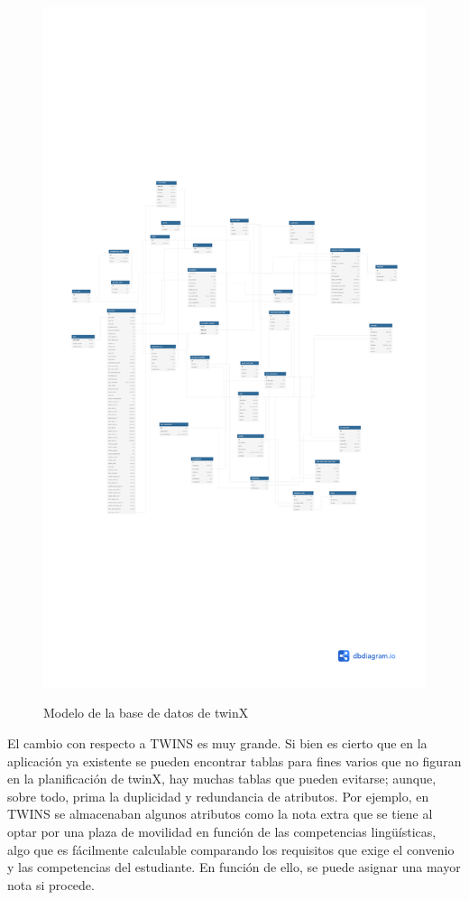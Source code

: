 \begin{figure}[H]
	\centering
	\includegraphics[page=2,width=\textwidth,height=\textheight,trim=0 0 0 10cm, clip=true]{pdf/modelo_bd}
	\label{fig:modeloBD}
	\caption{Modelo de la base de datos de twinX}
\end{figure}

El cambio con respecto a TWINS es muy grande. Si bien es cierto que en la aplicación ya existente se pueden encontrar tablas para fines varios que no figuran en la planificación de twinX, hay muchas tablas que pueden evitarse; aunque, sobre todo, prima la duplicidad y redundancia de atributos. Por ejemplo, en TWINS se almacenaban algunos atributos como la nota extra que se tiene al optar por una plaza de movilidad en función de las competencias lingüísticas, algo que es fácilmente calculable comparando los requisitos que exige el convenio y las competencias del estudiante. En función de ello, se puede asignar una mayor nota si procede.

